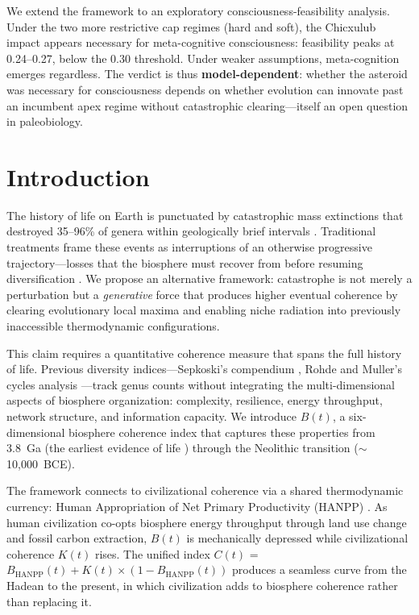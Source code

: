 \documentclass[10pt,letterpaper]{article}
\newcommand{\bt}{$B(t)$}
\newcommand{\kt}{$K(t)$}
\newcommand{\ct}{$C(t)$}
\begin{document}
We extend the framework to an exploratory consciousness-feasibility analysis.
Under the two more restrictive cap regimes (hard and soft), the Chicxulub
impact appears necessary for meta-cognitive consciousness: feasibility peaks
at 0.24--0.27, below the 0.30 threshold. Under weaker assumptions, meta-cognition
emerges regardless. The verdict is thus \textbf{model-dependent}: whether
the asteroid was necessary for consciousness depends on whether evolution
can innovate past an incumbent apex regime without catastrophic clearing---itself
an open question in paleobiology.

\linenumbers

\section*{Introduction}

The history of life on Earth is punctuated by catastrophic mass extinctions
that destroyed 35--96\% of genera within geologically brief intervals
\cite{sepkoski1982, bambach2006, raup1982}. Traditional treatments frame
these events as interruptions of an otherwise progressive trajectory---losses
that the biosphere must recover from before resuming diversification
\cite{erwin2001, kirchner2000}. We propose an alternative framework:
catastrophe is not merely a perturbation but a \emph{generative} force that
produces higher eventual coherence by clearing evolutionary local maxima
and enabling niche radiation into previously inaccessible thermodynamic
configurations.

This claim requires a quantitative coherence measure that spans the full
history of life. Previous diversity indices---Sepkoski's compendium
\cite{sepkoski1982}, Rohde and Muller's cycles analysis
\cite{rohde2005}---track genus counts without integrating the multi-dimensional
aspects of biosphere organization: complexity, resilience, energy throughput,
network structure, and information capacity. We introduce \bt{}, a
six-dimensional biosphere coherence index that captures these properties from
3.8~Ga (the earliest evidence of life \cite{mojzsis1996}) through the
Neolithic transition ($\sim$10,000~BCE).

The framework connects to civilizational coherence via a shared thermodynamic
currency: Human Appropriation of Net Primary Productivity (HANPP) \cite{haberl2007}.
As human civilization co-opts biosphere energy throughput through land use change
and fossil carbon extraction, \bt{} is mechanically depressed while civilizational
coherence \kt{} rises. The unified index \ct{} = $B_\text{HANPP}(t) + K(t) \times
(1 - B_\text{HANPP}(t))$ produces a seamless curve from the Hadean to the present,
in which civilization adds to biosphere coherence rather than replacing it.
\end{document}
